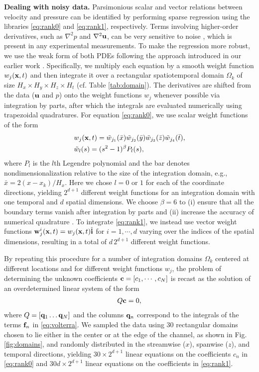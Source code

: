 \documentclass[9pt,twocolumn,twoside,lineno]{pnas-new}
\begin{document}
{\bf Dealing with noisy data.} Parsimonious scalar and vector relations between velocity and pressure can be identified by performing sparse regression using the libraries \eqref{eq:rank0} and \eqref{eq:rank1}, respectively. 
Terms involving higher-order derivatives, such as $\nabla^2p$ and $\nabla^2{\bf u}$, can be very sensitive to noise \cite{rudy2017,reinbold2019}, which is present in any experimental measurements. 
To make the regression more robust, we use the weak form of both PDEs following the approach introduced in our earlier work \cite{gurevich2019}. 
Specifically, we multiply each equation by a smooth weight function $w_j({\bf x},t)$ and then integrate it over a rectangular spatiotemporal domain $\Omega_k$ of size $H_x\times H_y\times H_z\times H_t$  (cf. Table \ref{tab:domain}). 
The derivatives are shifted from the data (${\bf u}$ and $p$) onto the weight functions $w_j$ whenever possible via integration by parts, after which the integrals are evaluated numerically using trapezoidal quadratures. 
For equation \eqref{eq:rank0}, we use scalar weight functions of the form
\begin{align} \label{eq:wf}
&w_j({\bf x},t) = \tilde{w}_{j_1}(\bar{x})\tilde{w}_{j_2}(\bar{y})\tilde{w}_{j_3}(\bar{z})\tilde{w}_{j_4}(\bar{t}), \nonumber\\
&\tilde{w}_l(s) = (s^2-1)^\beta P_l(s),
\end{align}
where $P_l$ is the $l$th Legendre polynomial and the bar denotes nondimensionalization relative to the size of the integration domain, e.g., $\bar{x}=2(x-x_k)/H_x$. Here we chose $l=0$ or $1$ for each of the coordinate directions, yielding $2^{d+1}$ different weight functions for 
an integration domain with one temporal and $d$ spatial dimensions.
We choose $\beta = 6$ to (i) ensure that all the boundary terms vanish after integration by parts and (ii) increase the accuracy of numerical quadrature \cite{gurevich2019}. To integrate \eqref{eq:rank1}, we instead use vector weight functions ${\bf w}^i_j({\bf x},t) = w_j({\bf x},t)\hat{\bf i}$ for $i=1,\cdots,d$ varying over the indices of the spatial dimensions, resulting in a total of $d\,2^{d+1}$ different weight functions. 

By repeating this procedure for a number of integration domains $\Omega_k$ centered at different locations and for different weight functions $w_j$, the problem of determining the unknown coefficients ${\bf c}=[c_1,\cdots,c_N]$ is recast as the solution of an overdetermined linear system of the form
\begin{align}
    Q{\bf c} = 0,
    \label{eq:lin}
\end{align}
where $Q = [{\bf q}_1 \dots {\bf q}_N]$ and the columns ${\bf q}_n$ correspond to the integrals of the terms ${\bf f}_n$ in \eqref{eq:volterra}. We sampled the data using 30 rectangular domains chosen to lie either in the center or at the edge of the channel, as shown in Fig. \ref{fig:domains}, and randomly distributed in the streamwise ($x$), spanwise ($z$), and temporal directions, yielding $30\times 2^{d+1}$ linear equations on the coefficients $c_n$ in \eqref{eq:rank0} and $30d\times 2^{d+1}$ linear equations on the coefficients in \eqref{eq:rank1}.
\end{document}
